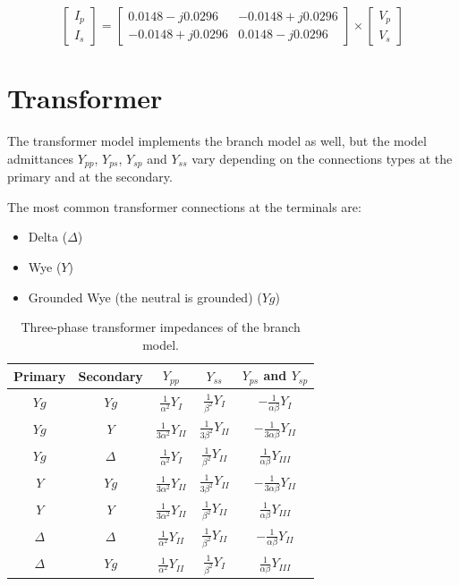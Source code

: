 \documentclass[a4paper,twoside,fleqn]{tufte-book}
\begin{document}
$$
\left[\begin{array}{c}
I_p \\
I_s
\end{array}\right] = \left[\begin{array}{cc}
0.0148 -j0.0296 & -0.0148 +j0.0296\\
-0.0148 +j0.0296 & 0.0148 -j0.0296
\end{array}\right] \times \left[\begin{array}{c}
V_p \\
V_s
\end{array}\right]
$$

\newpage
\section{Transformer}

The transformer model implements the branch model as well, but the model admittances $Y_{pp}$, $Y_{ps}$, $Y_{sp}$ and $Y_{ss}$ vary depending on the connections types at the primary and at the secondary.

The most common transformer connections at the terminals are:

\begin{itemize}
\item Delta ($\Delta$)
\item Wye ($Y$)
\item Grounded Wye (the neutral is grounded) ($Yg$)
\end{itemize}




\begin{table}[h!]
\begin{center}
\begin{tabular}{ccccc}
\toprule
Primary & Secondary & $Y_{pp}$  & $Y_{ss}$ & $Y_{ps}$ and $Y_{sp}$\\
\midrule
 $Yg$ & $Yg$ 			& $\frac{1}{\alpha^2}Y_I$ 				& $\frac{1}{\beta^2}Y_I$ 		& $-\frac{1}{\alpha\beta}Y_I$\\
 $Yg$ & $Y$ 			& $\frac{1}{3\alpha^2}Y_{II}$			& $\frac{1}{3\beta^2}Y_{II}$	& $-\frac{1}{3\alpha\beta}Y_{II}$	\\
 $Yg$ & $\Delta$  		& $\frac{1}{\alpha^2}Y_I$ 				& $\frac{1}{\beta^2}Y_{II}$ 	& $\frac{1}{\alpha\beta}Y_{III}$	 \\
 $Y$ & $Yg$ 			& $\frac{1}{3\alpha^2}Y_{II}$			& $\frac{1}{3\beta^2}Y_{II}$	& $-\frac{1}{3\alpha\beta}Y_{II}$ \\
 $Y$ & $Y$  			& $\frac{1}{3\alpha^2}Y_{II}$			& $\frac{1}{\beta^2}Y_{II}$ 	& $\frac{1}{\alpha\beta}Y_{III}$	 \\
 $\Delta$ & $\Delta$ 	& $\frac{1}{\alpha^2}Y_{II}$			& $\frac{1}{\beta^2}Y_{II}$		& $-\frac{1}{\alpha\beta}Y_{II}$\\
 $\Delta$ & $Yg$ 		& $\frac{1}{\alpha^2}Y_{II}$			& $\frac{1}{\beta^2}Y_{I}$		& $\frac{1}{\alpha\beta}Y_{III}$\\
\bottomrule
\end{tabular}
\end{center}
  \caption{Three-phase transformer impedances of the branch model.}
  \label{transfoemer_impedances_table}
\end{table}
\end{document}
